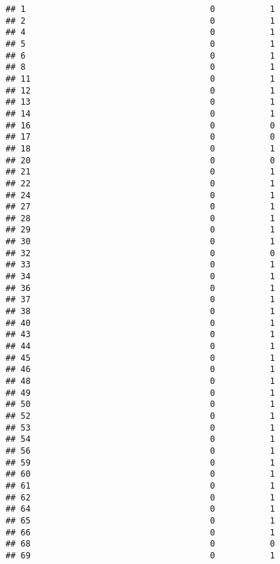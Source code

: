 \documentclass[
]{article}
\begin{document}
\begin{verbatim}
## 1                                     0           1
## 2                                     0           1
## 4                                     0           1
## 5                                     0           1
## 6                                     0           1
## 8                                     0           1
## 11                                    0           1
## 12                                    0           1
## 13                                    0           1
## 14                                    0           1
## 16                                    0           0
## 17                                    0           0
## 18                                    0           1
## 20                                    0           0
## 21                                    0           1
## 22                                    0           1
## 24                                    0           1
## 27                                    0           1
## 28                                    0           1
## 29                                    0           1
## 30                                    0           1
## 32                                    0           0
## 33                                    0           1
## 34                                    0           1
## 36                                    0           1
## 37                                    0           1
## 38                                    0           1
## 40                                    0           1
## 43                                    0           1
## 44                                    0           1
## 45                                    0           1
## 46                                    0           1
## 48                                    0           1
## 49                                    0           1
## 50                                    0           1
## 52                                    0           1
## 53                                    0           1
## 54                                    0           1
## 56                                    0           1
## 59                                    0           1
## 60                                    0           1
## 61                                    0           1
## 62                                    0           1
## 64                                    0           1
## 65                                    0           1
## 66                                    0           1
## 68                                    0           0
## 69                                    0           1

\end{verbatim}
\end{document}
